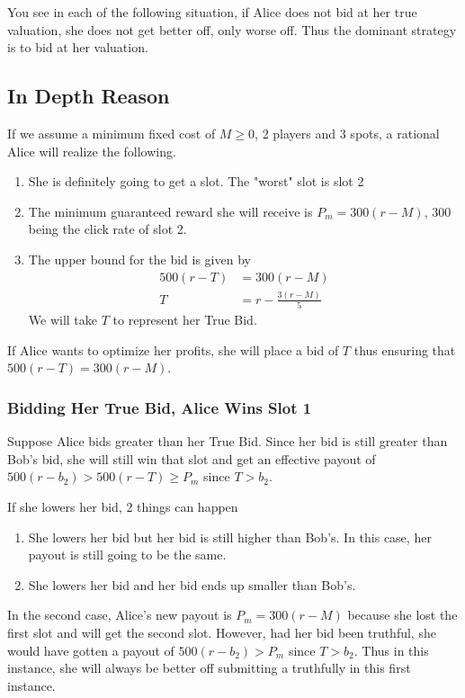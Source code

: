 \documentclass[]{article}
\begin{document}
You see in each of the following situation, if Alice does not bid at her true valuation, she does not get better off, only worse off. Thus the dominant strategy is to bid at her valuation.

\subsection*{In Depth Reason}

If we assume a minimum fixed cost of $M \geq 0$, 2 players and 3 spots, a rational Alice will realize the following.

\begin{enumerate}
	\item She is definitely going to get a slot. The "worst" slot is slot 2
	\item The minimum guaranteed reward she will receive is $P_m = 300(r - M)$, 300 being the click rate of slot 2.
	\item The upper bound for the bid is given by 
	\begin{align*}
		500 (r - T) &= 300(r - M) \\
		T &= r - \frac{3(r - M)}{5}
	\end{align*}
	We will take $T$ to represent her True Bid.
\end{enumerate}

If Alice wants to optimize her profits, she will place a bid of $T$ thus ensuring that $500 (r - T) = 300(r - M)$.

\subsubsection*{Bidding Her True Bid, Alice Wins Slot 1}

Suppose Alice bids greater than her True Bid. Since her bid is still greater than Bob's bid, she will still win that slot and get an effective payout of $500(r - b_2) > 500(r - T) \geq P_m$ since $T > b_2$.

If she lowers her bid, 2 things can happen

\begin{enumerate}
	\item She lowers her bid but her bid is still higher than Bob's. In this case, her payout is still going to be the same.
	\item She lowers her bid and her bid ends up smaller than Bob's.
\end{enumerate}

In the second case, Alice's new payout is $P_m = 300(r - M)$ because she lost the first slot and will get the second slot. However, had her bid been truthful, she would have gotten a payout of $500(r - b_2) > P_m $ since $T > b_2$. Thus in this instance, she will always be better off submitting a truthfully in this first instance.
\end{document}
